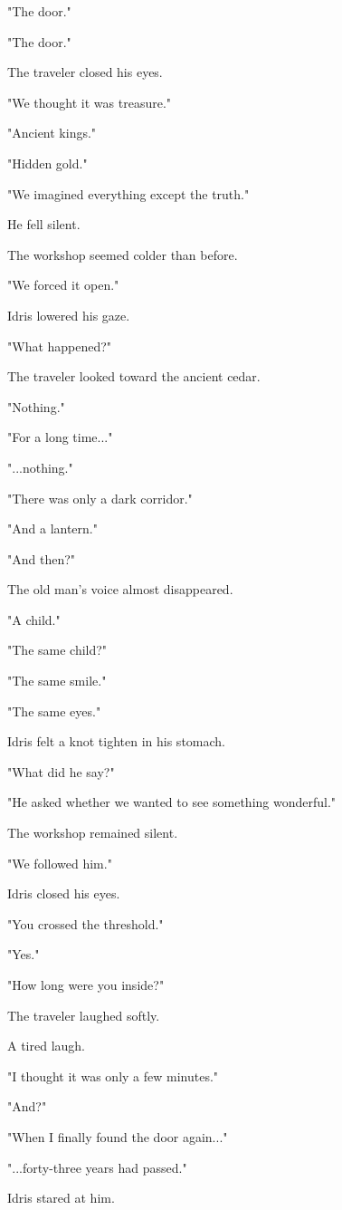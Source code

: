 \documentclass[12pt,openany]{book}
\begin{document}
"The door."

"The door."

The traveler closed his eyes.

"We thought it was treasure."

"Ancient kings."

"Hidden gold."

"We imagined everything except the truth."

He fell silent.

The workshop seemed colder than before.

"We forced it open."

Idris lowered his gaze.

"What happened?"

The traveler looked toward the ancient cedar.

"Nothing."

"For a long time..."

"...nothing."

"There was only a dark corridor."

"And a lantern."

"And then?"

The old man's voice almost disappeared.

"A child."

"The same child?"

"The same smile."

"The same eyes."

Idris felt a knot tighten in his stomach.

"What did he say?"

"He asked whether we wanted to see something wonderful."

The workshop remained silent.

"We followed him."

Idris closed his eyes.

"You crossed the threshold."

"Yes."

"How long were you inside?"

The traveler laughed softly.

A tired laugh.

"I thought it was only a few minutes."

"And?"

"When I finally found the door again..."

"...forty-three years had passed."

Idris stared at him.
\end{document}
